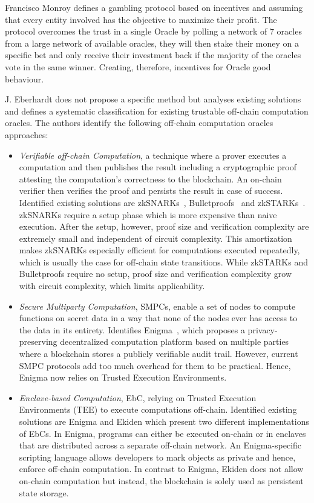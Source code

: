 Francisco Monroy \citet{MontotoMonroy2018} defines a gambling protocol based on incentives and assuming that every entity involved has the objective to maximize their profit. The protocol overcomes the trust in a single Oracle by polling a network of 7 oracles from a large network of available oracles, they will then stake their money on a specific bet and only receive their investment back if the majority of the oracles vote in the same winner. Creating, therefore, incentives for Oracle good behaviour.

J. Eberhardt \citet{Eberhardt2018} does not propose a specific method but analyses existing solutions and defines a systematic classification for existing trustable off-chain computation oracles. The authors identify the following off-chain computation oracles approaches:

\begin{itemize}
  \item \textit{Verifiable off-chain Computation}, a technique where a prover executes a computation and then publishes the result including a cryptographic proof attesting the computation’s correctness to the blockchain. An on-chain verifier then verifies the proof and persists the result in case of success. Identified existing solutions are zkSNARKs~\citet{Ben-SassonTechnionAlessandroChiesa2019}, Bulletproofs~\citet{Bunz2018} and zkSTARKs~\citet{Ben-Sasson2018}. zkSNARKs require a setup phase which is more expensive than naive execution. After the setup, however, proof size and verification complexity are extremely small and independent of circuit complexity. This amortization makes zkSNARKs especially efficient for computations executed repeatedly, which is usually the case for off-chain state transitions. While zkSTARKs and Bulletproofs require no setup, proof size and verification complexity grow with circuit complexity, which limits applicability.
  \item \textit{Secure Multiparty Computation}, SMPCs, enable a set of nodes to compute functions on secret data in a way that none of the nodes ever has access to the data in its entirety. Identifies Enigma~\citet{Tam2018}, which proposes a privacy-preserving decentralized computation platform based on multiple parties where a blockchain stores a publicly verifiable audit trail. However, current SMPC protocols add too much overhead for them to be practical. Hence, Enigma now relies on Trusted Execution Environments.
  \item \textit{Enclave-based Computation}, EbC, relying on Trusted Execution Environments (TEE) to execute computations off-chain. Identified existing solutions are Enigma and Ekiden \citet{Cheng2018} which present two different implementations of EbCs. In Enigma, programs can either be executed on-chain or in enclaves that are distributed across a separate off-chain network. An Enigma-specific scripting language allows developers to mark objects as private and hence, enforce off-chain computation. In contrast to Enigma, Ekiden does not allow on-chain computation but instead, the blockchain is solely used as persistent state storage.

\end{itemize}
